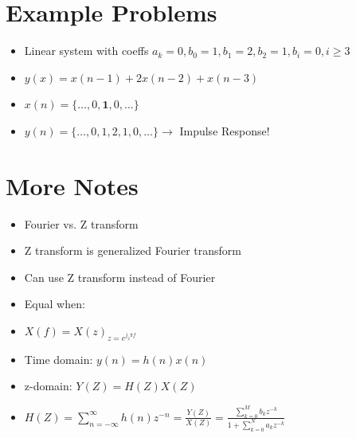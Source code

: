\documentclass[12pt, letter]{article}
\begin{document}
\section{Example Problems}%
\label{sec:example_problems}
\begin{itemize}
	\item Linear system with coeffs $a_k = 0, b_0 = 1, b_1 = 2, b_2=1, b_i=0, i\ge 3$
	\item $y(x) = x(n-1)+2x(n-2)+x(n-3)$ 
	\item $x(n) = \{\ldots,0, \mathbf{1}, 0,\ldots\}$
	\item $y(n) = \{\ldots,0,1,2,1,0,\ldots\} \to$ Impulse Response!
\end{itemize}

\section{More Notes}%
\label{sec:more_notes}

\begin{itemize}
	\item Fourier vs. Z transform
	\item Z transform is generalized Fourier transform
	\item Can use Z transform instead of Fourier
	\item Equal when:
	\item $X(f) = X(z)_{z=e^{j_2\pi f}}$
	\item Time domain: $y(n) = h(n)x(n)$
	 \item z-domain: $Y(Z) = H(Z)X(Z)$
	\item $H(Z) = \sum_{n=-\infty}^{\infty} h(n)z^{-n} = \frac{Y(Z)}{X(Z)}  = \frac{\sum_{k=0}^{M} b_kz^{-k}}{1+\sum_{k=0}^{N} a_kz^{-k}}$
\end{itemize}
\end{document}

